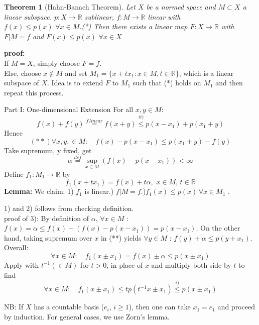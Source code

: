 \documentclass{article}
\newcommand{\nextline}{\hfill\break}
\newcommand{\func}[3]{${#1}:{#2}\xrightarrow{}{#3}$}
\newcommand{\real}{\mathbb{R}}
\newtheorem{theorem}[example]{Theorem}
\begin{document}
\begin{theorem}[Hahn-Banach Theorem]\rm\nextline
    Let $X$ be a normed space and $M\subset X$ a linear subspace. \func{p}{X}{\real} sublinear, \func{f}{M}{\real} linear with 
    $f(x)\leq p(x)\,\,\forall x\in M$.(*)
    Then there exists a linear map \func{F}{X}{\real} with $F|M=f$ and $F(x)\leq p(x)\,\,\forall x\in X$
\end{theorem}
\textbf{proof:}\\
    If $M=X$, simply choose $F=f$.\\
    Else, choose $x\not \in M$ and set $M_1=\{x+tx_1:x\in M,t\in\real\}$, which is a linear subspace of $X$. Idea is to extend $F$ to $M_1$ such that  (*) holds on $M_1$ and then repeat this process.
    \begin{pf}{Part I: One-dimensional Extension}{}
    For all $x,y\in M$:
    $$
    f(x)+f(y)
    \stackrel{f\,linear}{=}f(x+y)
    \stackrel{ii)}{\leq}p(x-x_1)+p(x_1+y)
    $$
    Hence
    $$
    (**)\forall x,y,\in M:\quad f(x)-p(x-x_1)\leq p(x_1+y)-f(y)
    $$
    Take supremum, y fixed, get 
    $$
\alpha\stackrel{def}{=}\sup_{x\in M}\left(f(x)-p(x-x_1)\right)<\infty
    $$
    Define \func{f_1}{M_1}{\real} by 
    $$f_1(x+tx_1)=f(x)+t\alpha,\,\,x\in M,\,t\in \real$$
    {\bf Lemma:}
       We claim: 1) $f_1$ is linear.) $f|M=f$.)$f_1(x)\leq p(x)\,\forall x\in M_1$ .

    1) and 2) follows from checking definition.\\
    proof of 3):
    By definition of $\alpha$,  $\forall x\in M$ : $f(x)=\alpha\leq f(x)-(f(x)-p(x-x_1))=p(x-x_1)$. On the other hand, taking supremum over $x$ in (**) yields $\forall y \in M$ : $f(y)+\alpha\leq p(y+x_1)$. Overall:
    $$
    \forall x\in M:\quad f_1(x\pm x_1)=f(x)\pm \alpha\leq p(x\pm x_1)
    $$
    Apply with $t^{-1}(\in M)$ for $t>0$, in place of $x$ and multiply both side by $t$ to find
    $$
    \forall x\in M:\quad f_1(x\pm x_1)\leq  tp(t^{-1}x\pm x_1)\stackrel{i)}{\leq}{p(x\pm x_1)}
    $$

    NB: If $X$ has a countable basis ($e_i,\,i\geq 1
    $), then one can take $x_1=e_1$ and proceed by induction. For general cases, we use Zorn's lemma.
    
    \end{pf}
\end{document}
